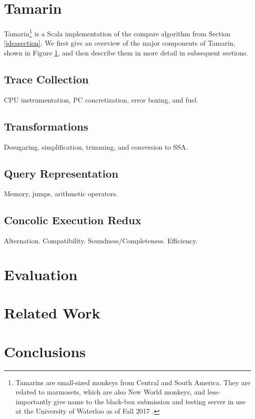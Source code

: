 \documentclass{llncs}
\begin{document}
\section{Tamarin}

Tamarin\footnote{Tamarins are small-sized monkeys from Central and South America. They are related to marmosets, which are also New World monkeys, and less-importantly give name to the black-box submission and testing server in use at the University of Waterloo as of Fall 2017 \cite{spacco2006marmoset}.} is a Scala implementation of the \textsf{compare} algorithm from Section \ref{ideasection}. We first give an overview of the major components of Tamarin, shown in Figure \ref{tamarinstructure}, and then describe them in more detail in subsequent sections.

\begin{figure}
\label{tamarinstructure}
\end{figure}

\subsection{Trace Collection}

CPU instrumentation, PC concretization, error boxing, and fuel.

\subsection{Transformations}

Desugaring, simplification, trimming, and conversion to SSA.

\subsection{Query Representation}

Memory, jumps, arithmetic operators.

\subsection{Concolic Execution Redux}

Alternation. Compatibility. Soundness/Completeness. Efficiency.

\section{Evaluation}

\section{Related Work}

\section{Conclusions}



\end{document}
